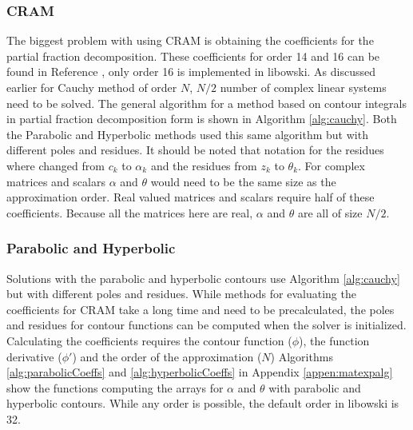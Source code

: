 \subsubsection{CRAM}
The biggest problem with using CRAM is obtaining the coefficients for the partial fraction decomposition. These coefficients for order 14 and 16 can be found in Reference \cite{pusa2011}, only order 16 is implemented in libowski. As discussed earlier for Cauchy method of order $N$, $N/2$ number of complex linear systems need to be solved. The general algorithm for a method based on contour integrals in partial fraction decomposition form is shown in Algorithm \ref{alg:cauchy}. Both the Parabolic and Hyperbolic methods used this same algorithm but with different poles and residues. It should be noted that notation for the residues where changed from $c_{k}$ to $\alpha_{k}$ and the residues from $z_{k}$ to $\theta_{k}$. For complex matrices and scalars $\alpha$ and $\theta$ would need to be the same size as the approximation order. Real valued matrices and scalars require half of these coefficients. Because all the matrices here are real, $\alpha$ and $\theta$ are all of size $N/2$. 




\subsubsection{Parabolic and Hyperbolic}
Solutions with the parabolic and hyperbolic contours use Algorithm \ref{alg:cauchy} but with different poles and residues. While methods for evaluating the coefficients for CRAM take a long time and need to be precalculated, the poles and residues for contour functions can be computed when the solver is initialized. Calculating the coefficients requires the contour function ($\phi$), the function derivative ($\phi'$) and the order of the approximation ($N$) Algorithms \ref{alg:parabolicCoeffs} and \ref{alg:hyperbolicCoeffs} in Appendix \ref{appen:matexpalg} show the functions computing the arrays for $\alpha$ and $\theta$ with parabolic and hyperbolic contours. While any order is possible, the default order in libowski is 32. 

